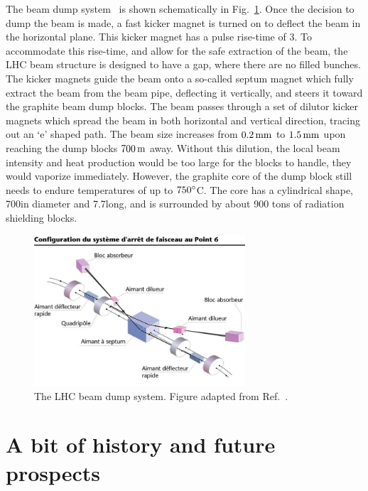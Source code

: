 The beam dump system~\cite{Schmidt:2006mi} is shown schematically in Fig.~\ref{fig:lhc_beam_dump}. 
Once the decision to dump the beam is made, a fast kicker magnet is turned on to deflect the beam
in the horizontal plane. 
This kicker magnet has a pulse rise-time of 3\mus. To accommodate this rise-time, and allow for
the safe extraction of the beam, the LHC beam structure is designed to have a gap, where there are
no filled bunches. 
The kicker magnets guide the beam onto a so-called septum magnet which fully extract the beam from
the beam pipe, deflecting it vertically, and steers it toward the graphite beam dump blocks. The
beam passes through a set of dilutor kicker magnets which spread the beam in both horizontal and
vertical direction, tracing out an `e' shaped path. 
The beam size increases from $0.2\mm$ to $1.5\mm$ upon reaching the dump blocks $700\meter$ away.
Without this dilution, the local beam intensity and heat production would be too large for the
blocks to handle, they would vaporize immediately. However, the graphite core of the dump block
still needs to endure temperatures of up to $750\de$C. The core has a cylindrical shape, 700\mm in
diameter and 7.7\meter long, and is surrounded by about 900 tons of radiation shielding blocks.

\begin{figure}[htpb]
  \centering
  \includegraphics[width=0.7\textwidth,clip=true,trim=0 0 0 2cm]
  {figures/lhc/lhc_beamdump_cds842348.jpg}
  \caption{The LHC beam dump system. Figure adapted from Ref.~\cite{lhc_beamdump}.
  \label{fig:lhc_beam_dump}}
\end{figure}


\section{A bit of history and future prospects}

